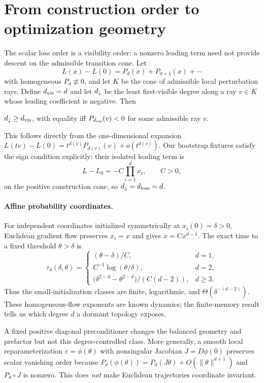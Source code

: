 \section{From construction order to optimization geometry}
\label{sec:dynamics}

The scalar loss order is a visibility order: a nonzero leading term need not provide descent on the admissible transition cone. Let
\[
L(x)-L(0)=P_d(x)+P_{d+1}(x)+\cdots
\]
with homogeneous $P_d\not\equiv0$, and let $K$ be the cone of admissible local perturbation rays. Define $d_{\mathrm{vis}}=d$ and let $d_{\downarrow}$ be the least first-visible degree along a ray $v\in K$ whose leading coefficient is negative. Then
\begin{proposition}
\label{prop:descent}
$d_{\downarrow}\geq d_{\mathrm{vis}}$, with equality iff $P_{d_{\mathrm{vis}}}(v)<0$ for some admissible ray $v$.
\end{proposition}
This follows directly from the one-dimensional expansion $L(tv)-L(0)=t^{d(v)}P_{d(v)}(v)+o(t^{d(v)})$. Our bootstrap fixtures satisfy the sign condition explicitly: their isolated leading term is
\[
L-L_0=-C\prod_{i=1}^d x_i,\qquad C>0,
\]
on the positive construction cone, so $d_{\downarrow}=d_{\mathrm{loss}}=d$.

\paragraph{Affine probability coordinates.}
For independent coordinates initialized symmetrically at $x_i(0)=\delta>0$, Euclidean gradient flow preserves $x_i=x$ and gives $\dot x=Cx^{d-1}$. The exact time to a fixed threshold $\theta>\delta$ is
\[
\tau_d(\delta,\theta)=
\begin{cases}
(\theta-\delta)/C,&d=1,\\
C^{-1}\log(\theta/\delta),&d=2,\\
\big(\delta^{2-d}-\theta^{2-d}\big)/(C(d-2)),&d\geq3.
\end{cases}
\]
Thus the small-initialization classes are finite, logarithmic, and $\Theta(\delta^{-(d-2)})$. These homogeneous-flow exponents are known dynamics; the finite-memory result tells us which degree $d$ a dormant topology exposes.

A fixed positive diagonal preconditioner changes the balanced geometry and prefactor but not this degree-controlled class. More generally, a smooth local reparameterization $\varepsilon=\phi(\theta)$ with nonsingular Jacobian $J=D\phi(0)$ preserves scalar vanishing order because $P_d(\phi(\theta))=P_d(J\theta)+O(\|\theta\|^{d+1})$ and $P_d\circ J$ is nonzero. This does \emph{not} make Euclidean trajectories coordinate invariant.

